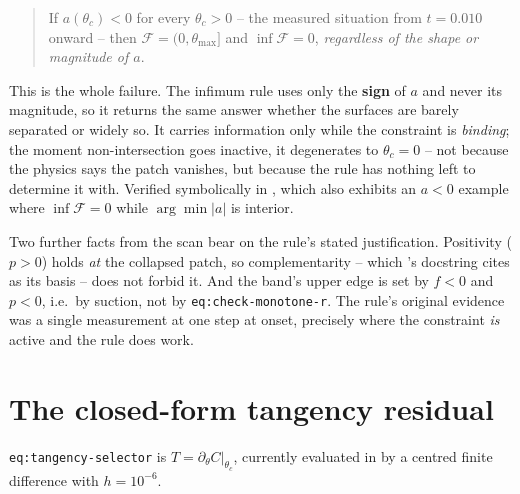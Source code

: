 \documentclass[11pt]{article}
\begin{document}
\begin{quote}
If $a(\theta_c)<0$ for every $\theta_c>0$ -- the measured situation from $t=0.010$ onward --
then $\mathcal F=(0,\theta_{\max}]$ and $\inf\mathcal F=0$, \emph{regardless of the shape or
magnitude of $a$}.
\end{quote}

This is the whole failure. The infimum rule uses only the \textbf{sign} of $a$ and never its
magnitude, so it returns the same answer whether the surfaces are barely separated or widely so.
It carries information only while the constraint is \emph{binding}; the moment non-intersection
goes inactive, it degenerates to $\theta_c=0$ -- not because the physics says the patch vanishes,
but because the rule has nothing left to determine it with. Verified symbolically in
, which also exhibits an $a<0$ example where
$\inf\mathcal F=0$ while $\arg\min|a|$ is interior.

Two further facts from the scan bear on the rule's stated justification. Positivity ($p>0$) holds
\emph{at} the collapsed patch, so complementarity -- which 's docstring cites
as its basis -- does not forbid it. And the band's upper edge is set by $f<0$ and $p<0$, i.e.\ by
suction, not by \texttt{eq:check-monotone-r}. The rule's original evidence was a single measurement
at one step at onset, precisely where the constraint \emph{is} active and the rule does work.

\section{The closed-form tangency residual}

\texttt{eq:tangency-selector} is $T=\partial_\theta C|_{\theta_c}$, currently evaluated in
 by a centred finite difference with $h=10^{-6}$.
\end{document}
